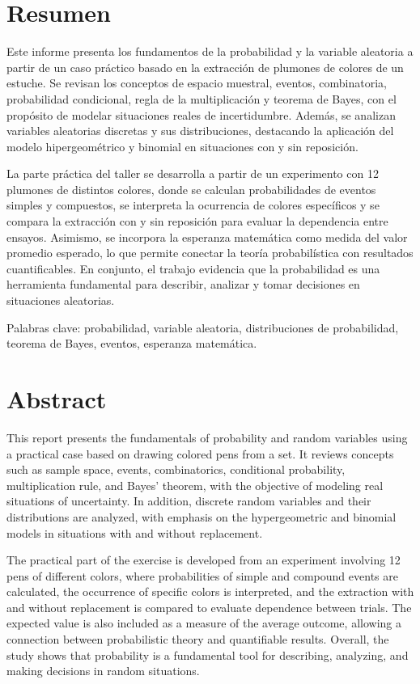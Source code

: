 \documentclass[10pt,letterpaper]{article}
\begin{document}


\section*{Resumen}
Este informe presenta los fundamentos de la probabilidad y la variable aleatoria a partir de un caso práctico basado en la extracción de plumones de colores de un estuche. Se revisan los conceptos de espacio muestral, eventos, combinatoria, probabilidad condicional, regla de la multiplicación y teorema de Bayes, con el propósito de modelar situaciones reales de incertidumbre. Además, se analizan variables aleatorias discretas y sus distribuciones, destacando la aplicación del modelo hipergeométrico y binomial en situaciones con y sin reposición.

La parte práctica del taller se desarrolla a partir de un experimento con 12 plumones de distintos colores, donde se calculan probabilidades de eventos simples y compuestos, se interpreta la ocurrencia de colores específicos y se compara la extracción con y sin reposición para evaluar la dependencia entre ensayos. Asimismo, se incorpora la esperanza matemática como medida del valor promedio esperado, lo que permite conectar la teoría probabilística con resultados cuantificables. En conjunto, el trabajo evidencia que la probabilidad es una herramienta fundamental para describir, analizar y tomar decisiones en situaciones aleatorias.

Palabras clave: probabilidad, variable aleatoria, distribuciones de probabilidad, teorema de Bayes, eventos, esperanza matemática.

\newpage
\section*{Abstract}
This report presents the fundamentals of probability and random variables using a practical case based on drawing colored pens from a set. It reviews concepts such as sample space, events, combinatorics, conditional probability, multiplication rule, and Bayes' theorem, with the objective of modeling real situations of uncertainty. In addition, discrete random variables and their distributions are analyzed, with emphasis on the hypergeometric and binomial models in situations with and without replacement.

The practical part of the exercise is developed from an experiment involving 12 pens of different colors, where probabilities of simple and compound events are calculated, the occurrence of specific colors is interpreted, and the extraction with and without replacement is compared to evaluate dependence between trials. The expected value is also included as a measure of the average outcome, allowing a connection between probabilistic theory and quantifiable results. Overall, the study shows that probability is a fundamental tool for describing, analyzing, and making decisions in random situations.
\end{document}
